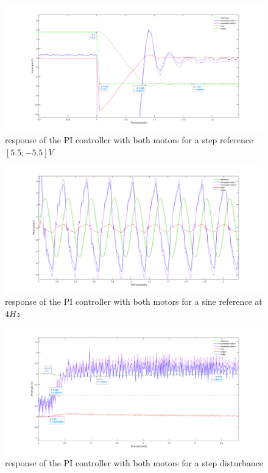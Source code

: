 \begin{figure}[H]
    \centering
    \includegraphics[width=\textwidth]{Pictures/stepRef_both.png}
    \caption{response of the PI controller with both motors for a step reference $[5.5; -5.5] V$}
    \label{fig:step reference for both}
\end{figure}
\begin{figure}[H]
    \centering
    \includegraphics[width=\textwidth]{Pictures/sinRef_both.png}
    \caption{response of the PI controller with both motors for a sine reference at $4 Hz$}
    \label{fig:sin reference for both}
\end{figure}
\begin{figure}[H]
    \centering
    \includegraphics[width=\textwidth]{Pictures/disturbance_rejection.png}
    \caption{response of the PI controller with both motors for a step disturbance}
    \label{fig:step disturbance for both}
\end{figure}

